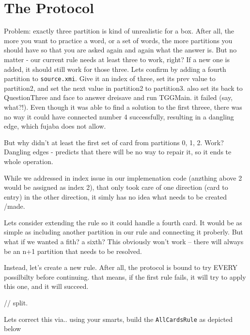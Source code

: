 \newpage
\section{The Protocol}
\genHeader

Problem: exactly three partition is kind of unrealistic for a box. After all, the more you want to practice a word, or a set of words, the more partitions you
should have so that you are asked again and again what the answer is. But no matter - our current rule needs at least three to work, right? If a new one is
added, it should still work for those three. Lets confirm by adding a fourth partition to \texttt{source.xmi}. Give it an index of three, set its prev value to
partition2, and set the next value in partition2 to partition3. also set its back to QuestionThree and face to answer dreisave and run TGGMain. it failed (say,
what?!). Even though it was able to find a solution to the first threee, there was no way it could have connected number 4 successfully, resulting in a dangling
edge, which fujaba does not allow.

But why didn't at least the first set of card from partitions 0, 1, 2. Work? Dangling edges - predicts that there will be no way to repair it, so it ends te
whole operation.

While we addressed in index issue in our implemenation code (anzthing above 2 would be assigned as index 2), that only took care of one direction (card to
entry) in the other direction, it simly has no idea what needs to be created /made. 

Lets consider extending the rule so it could handle a fourth card. It would be as simple as including another partition in our rule and connecting it proberly.
But what if we wanted a fith? a sixth?  This obviously won't work -- there will always be an n+1 partition that needs to be resolved.

Instead, let's create a new rule. After all, the protocol is bound to try EVERY possilbilty before continuing. that means, if the first rule fails, it will try
to apply this one, and it will succeed.

// split.

Lets correct this via.. using your smarts, build the \texttt{AllCardsRule} as depicted below





